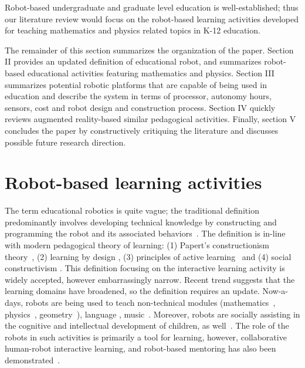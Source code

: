 \documentclass[conference]{IEEEtran}
\begin{document}
Robot-based undergraduate and graduate level education is well-established; thus our literature review would focus on 
the robot-based learning activities developed for teaching mathematics and physics related topics in K-12 education.

The remainder of this section summarizes the organization of the paper. Section II provides an updated definition of 
educational robot, and summarizes robot-based educational activities featuring mathematics and physics. Section III 
summarizes potential robotic platforms that are capable of being used in education and describe the system in terms 
of processor, autonomy hours, sensors, cost and robot design and construction process. Section IV quickly reviews 
augmented reality-based similar pedagogical activities. Finally, section V concludes the paper by constructively 
critiquing the literature and discusses possible future research direction.

\section{Robot-based learning activities}

The term educational robotics is quite vague; the traditional definition predominantly involves developing technical 
knowledge by constructing and programming the robot and its associated behaviors~\cite{hsiu2003designing, 
barker2007robotics, balch2008designing}. The definition is in-line with modern pedagogical theory of learning: (1) 
Papert's constructionism theory~\cite{papert1980mindstorms, ackermann2001piaget}, (2) learning by design 
\cite{goldman2004using}, (3) principles of active learning~\cite{harmin2006inspiring} and (4) social constructivism 
\cite{vygotsky1980mind}. This definition focusing on the interactive learning activity is widely accepted, however 
embarrassingly narrow. Recent trend suggests that the learning domains have broadened, so the definition requires an 
update. Now-a-days, robots are being used to teach non-technical modules (mathematics~\cite{highfield2008early, 
robotmath}, physics~\cite{mitnik2008autonomous}, geometry~\cite{mitnik2008autonomous, robotmath}), language 
\cite{kanda2004interactive, han2009r}, music~\cite{han2009physical}. Moreover, robots are socially assisting in the 
cognitive and intellectual development of children, as well~\cite{mataric1999socially}. The role of the robots in such 
activities is primarily a tool for learning, however, collaborative human-robot interactive learning, and robot-based 
mentoring has also been demonstrated~\cite{mitnik2008autonomous}.
\end{document}
